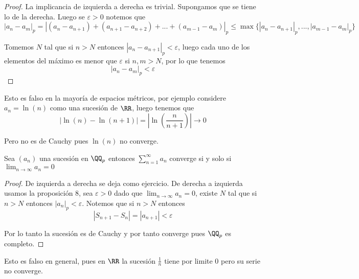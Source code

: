 \documentclass[a4paper,oneside,10.5pt]{USMArt}
\begin{document}
\begin{proof}
  La implicancia de izquierda a derecha es trivial. Supongamos que se tiene lo de la derecha. Luego se $\varepsilon > 0$
  notemos que
  \begin{equation*}
    |a_{n} - a_{m}|_{p} = |(a_{n} - a_{n + 1}) + (a_{n + 1} - a_{n +2}) + ... + (a_{m - 1} - a_{m})|_{p} \leq \max \{|a_{n} -a_{n + 1}|_{p}, ..., |a_{m - 1} - a_{m}|_{p}\}
  \end{equation*}

  Tomemos $N$ tal que si $n > N$ entonces $|a_{n} - a_{n + 1}|_{p} < \varepsilon$, luego cada uno de los elementos del
  máximo es menor que $\varepsilon$ si $n, m > N$, por lo que tenemos
  \begin{equation*}
    |a_{n} - a_{m}|_{p} < \varepsilon
  \end{equation*}
\end{proof}
\begin{adv}
  Esto es falso en la mayoría de espacios métricos, por ejemplo considere $a_{n} = \ln(n)$ como una sucesión de $\RR$,
  luego tenemos que
  \begin{equation*}
    |\ln(n) - \ln(n + 1)| = |\ln(\frac{n}{n + 1})| \to 0
  \end{equation*}

  Pero no es de Cauchy pues $\ln(n)$ no converge.
\end{adv}

\begin{prop}
  Sea $(a_{n})$ una sucesión en $\QQ_{p}$ entonces $\sum_{n = 1}^{\infty} a_{n}$ converge si y solo si $\lim_{n \to \infty} a_{n} = 0$
\end{prop}

\begin{proof}
  De izquierda a derecha se deja como ejercicio. De derecha a izquierda usamos la proposición $8$, sea $\varepsilon > 0$
  dado que $\lim_{n \to \infty} a_{n} = 0$, existe $N$ tal que si $n > N$ entonces $|a_{n}|_{p} < \varepsilon$. Notemos que
  si $n > N$ entonces
  \begin{equation*}
    |S_{n + 1} - S_{n}| = |a_{n + 1}| < \varepsilon
  \end{equation*}

  Por lo tanto la sucesión es de Cauchy y por tanto converge pues $\QQ_{p}$ es completo.
\end{proof}
\begin{adv}
  Esto es falso en general, pues en $\RR$ la sucesión $\frac{1}{n}$ tiene por limite $0$ pero su serie no converge.
\end{adv}
\end{document}
